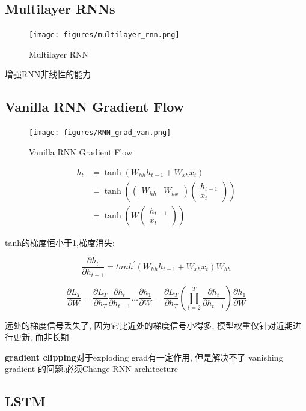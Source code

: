 	\subsection{Multilayer RNNs}
	\begin{figure}[htbp]
		\centering
		\texttt{[image: figures/multilayer\_rnn.png]}
		\caption{Multilayer RNN}
	\end{figure}

	增强RNN非线性的能力
	
	\subsection{Vanilla RNN Gradient Flow}

	\begin{figure}[H]
		\centering
		\texttt{[image: figures/RNN\_grad\_van.png]}
		\caption{Vanilla RNN Gradient Flow}
	\end{figure}

	\[
	\begin{aligned}
		h_{t}& =\tanh(W_{hh}h_{t-1}+W_{xh}x_{t})  \\
		&=\tanh\left(\begin{pmatrix}W_{hh}&W_{hx}\end{pmatrix}\begin{pmatrix}h_{t-1}\\x_t\end{pmatrix}\right) \\
		&=\tanh\left(W\begin{pmatrix}h_{t-1}\\x_t\end{pmatrix}\right)
		\end{aligned}	
	\]
	
	tanh的梯度恒小于1,梯度消失:

	\[
		\frac{\partial h_t}{\partial h_{t-1}}=tanh^{\prime}(W_{hh}h_{t-1}+W_{xh}x_t)W_{hh}	
	\]

	\[
		\frac{\partial L_T}{\partial W}=\frac{\partial L_T}{\partial h_T}\frac{\partial h_t}{\partial h_{t-1}}\ldots\frac{\partial h_1}{\partial W}=\frac{\partial L_T}{\partial h_T}(\prod_{t=2}^T\frac{\partial h_t}{\partial h_{t-1}})\frac{\partial h_1}{\partial W}	
	\]

	远处的梯度信号丢失了, 因为它比近处的梯度信号小得多, 模型权重仅针对近期进行更新, 而非长期
	
	\textbf{gradient clipping}对于exploding grad有一定作用, 但是解决不了 vanishing gradient 的问题.必须Change RNN architecture
	
	\subsection{LSTM}


